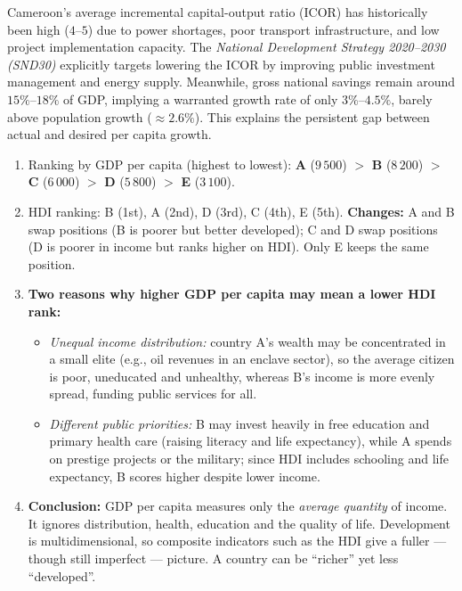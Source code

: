 \documentclass[11pt]{article}
\begin{document}
\begin{savaistu}
Cameroon's average incremental capital-output ratio (ICOR) has historically been high ($4$--$5$) due to power shortages, poor transport infrastructure, and low project implementation capacity. The \emph{National Development Strategy 2020--2030 (SND30)} explicitly targets lowering the ICOR by improving public investment management and energy supply. Meanwhile, gross national savings remain around $15\%$--$18\%$ of GDP, implying a warranted growth rate of only $3\%$--$4.5\%$, barely above population growth ($\approx 2.6\%$). This explains the persistent gap between actual and desired per capita growth.
\end{savaistu}

\begin{corrige}
\begin{enumerate}
\item Ranking by GDP per capita (highest to lowest): \textbf{A} ($9\,500$) $>$ \textbf{B} ($8\,200$) $>$ \textbf{C} ($6\,000$) $>$ \textbf{D} ($5\,800$) $>$ \textbf{E} ($3\,100$).
\item HDI ranking: B (1st), A (2nd), D (3rd), C (4th), E (5th). \textbf{Changes:} A and B swap positions (B is poorer but better developed); C and D swap positions (D is poorer in income but ranks higher on HDI). Only E keeps the same position.
\item \textbf{Two reasons why higher GDP per capita may mean a lower HDI rank:}
\begin{itemize}
\item \emph{Unequal income distribution:} country A's wealth may be concentrated in a small elite (e.g., oil revenues in an enclave sector), so the average citizen is poor, uneducated and unhealthy, whereas B's income is more evenly spread, funding public services for all.
\item \emph{Different public priorities:} B may invest heavily in free education and primary health care (raising literacy and life expectancy), while A spends on prestige projects or the military; since HDI includes schooling and life expectancy, B scores higher despite lower income.
\end{itemize}
\item \textbf{Conclusion:} GDP per capita measures only the \emph{average quantity} of income. It ignores distribution, health, education and the quality of life. Development is multidimensional, so composite indicators such as the HDI give a fuller — though still imperfect — picture. A country can be ``richer'' yet less ``developed''.
\end{enumerate}
\end{corrige}
\end{document}
